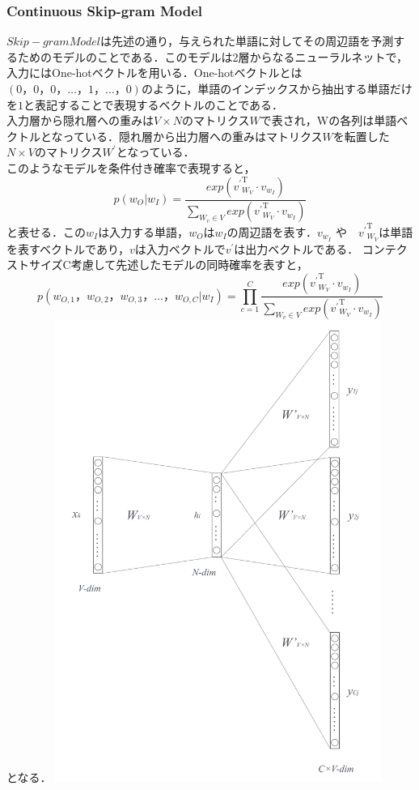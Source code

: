 \subsubsection{Continuous Skip-gram Model}
\label{tech:skipgram}
$ Skip-gram Model $は先述の通り，与えられた単語に対してその周辺語を予測するためのモデルのことである．このモデルは2層からなるニューラルネットで，入力にはOne-hotベクトルを用いる．One-hotベクトルとは$ (0，0，0， \ldots ，1， \ldots ，0) $のように，単語のインデックスから抽出する単語だけを$ 1 $と表記することで表現するベクトルのことである．\\
入力層から隠れ層への重みは$ V \times N $のマトリクス$ W $で表され，Wの各列は単語ベクトルとなっている．隠れ層から出力層への重みはマトリクス$ W $を転置した$ N \times V $のマトリクス$ W^{\prime} $となっている．\\
このようなモデルを条件付き確率で表現すると，
\[
p(w_{O}|w_{I}) = \frac{exp({{v^{\prime}}^{\mathrm{T}}_{W_{V}}} \cdot v_{w_{I}})}{\sum_{W_{v} \in{V}}exp({{v^{\prime}}^{\mathrm{T}}_{W_{V}}} \cdot v_{w_{I}})}
\]
と表せる．この$ w_{I} $は入力する単語，$ w_{O} $は$ w_{I} $の周辺語を表す．$ v_{w_{I}} $ や　$ {v^{\prime}}^{\mathrm{T}}_{W_{V}} $は単語を表すベクトルであり，$ v $は入力ベクトルで$ v^{\prime} $は出力ベクトルである．
コンテクストサイズC考慮して先述したモデルの同時確率を表すと，
\[
p(w_{O,1}，w_{O,2}，w_{O,3}， \ldots ，w_{O,C}|w_{I}) = \prod_{c=1}^{C} \frac{exp({{v^{\prime}}^{\mathrm{T}}_{W_{V}}} \cdot v_{w_{I}})}{\sum_{W_{v} \in{V}}exp({{v^{\prime}}^{\mathrm{T}}_{W_{V}}} \cdot v_{w_{I}})}
\]
となる．
\includegraphics[width=0.8\textwidth]{figures/skip-gram.pdf}
